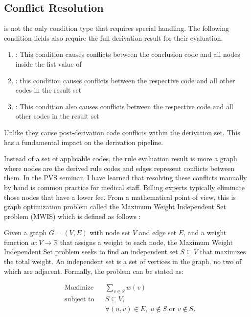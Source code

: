 \subsection{Conflict Resolution}

 is not the only condition type that requires special handling.
The following condition fields also require the full derivation result for their evaluation.
\begin{enumerate}
    \item {}: This condition causes conflicts between the conclusion code and all nodes inside the list value of 
    \item {}: this condition causes conflicts between the respective code and all other codes in the result set
    \item {}: This condition also causes conflicts between the respective code and all other codes in the result set
\end{enumerate}
Unlike  they cause post-derivation code conflicts within the derivation set.
This has a fundamental impact on the derivation pipeline.

Instead of a set of applicable codes, the rule evaluation result is more a graph where nodes are the derived rule codes and edges represent conflicts between them.
In the PVS seminar, I have learned that resolving these conflicts manually by hand is common practice for medical staff.
Billing experts typically eliminate those nodes that have a lower fee.
From a mathematical point of view, this is graph optimization problem called the Maximum Weight Independent Set problem (MWIS) which is defined as follows \cite{SAKAI2003313}:

Given a graph $G = (V, E)$ with node set $V$ and edge set $E$, and a weight function $w: V \rightarrow \mathbb{R}$ that assigns a weight to each node, the Maximum Weight Independent Set problem seeks to find an independent set $S \subseteq V$ that maximizes the total weight.
An independent set is a set of vertices in the graph, no two of which are adjacent.
Formally, the problem can be stated as:

\begin{equation}
    \begin{aligned}
        & \text{Maximize}
        & & \sum_{v \in S} w(v) \\
        & \text{subject to}
        & & S \subseteq V, \\
        &&& \forall (u, v) \in E, \; u \notin S \text{ or } v \notin S.
    \end{aligned}\label{eq:mwis}
\end{equation}

